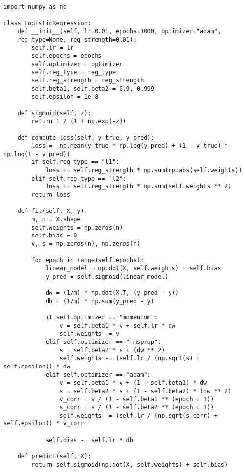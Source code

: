\begin{verbatim}
import numpy as np

class LogisticRegression:
    def __init__(self, lr=0.01, epochs=1000, optimizer="adam", 
    reg_type=None, reg_strength=0.01):
        self.lr = lr
        self.epochs = epochs
        self.optimizer = optimizer
        self.reg_type = reg_type
        self.reg_strength = reg_strength
        self.beta1, self.beta2 = 0.9, 0.999
        self.epsilon = 1e-8

    def sigmoid(self, z):
        return 1 / (1 + np.exp(-z))

    def compute_loss(self, y_true, y_pred):
        loss = -np.mean(y_true * np.log(y_pred) + (1 - y_true) * np.log(1 - y_pred))
        if self.reg_type == "l1":
            loss += self.reg_strength * np.sum(np.abs(self.weights))
        elif self.reg_type == "l2":
            loss += self.reg_strength * np.sum(self.weights ** 2)
        return loss

    def fit(self, X, y):
        m, n = X.shape
        self.weights = np.zeros(n)
        self.bias = 0
        v, s = np.zeros(n), np.zeros(n)

        for epoch in range(self.epochs):
            linear_model = np.dot(X, self.weights) + self.bias
            y_pred = self.sigmoid(linear_model)

            dw = (1/m) * np.dot(X.T, (y_pred - y))
            db = (1/m) * np.sum(y_pred - y)

            if self.optimizer == "momentum":
                v = self.beta1 * v + self.lr * dw
                self.weights -= v
            elif self.optimizer == "rmsprop":
                s = self.beta2 * s + (dw ** 2)
                self.weights -= (self.lr / (np.sqrt(s) + self.epsilon)) * dw
            elif self.optimizer == "adam":
                v = self.beta1 * v + (1 - self.beta1) * dw
                s = self.beta2 * s + (1 - self.beta2) * (dw ** 2)
                v_corr = v / (1 - self.beta1 ** (epoch + 1))
                s_corr = s / (1 - self.beta2 ** (epoch + 1))
                self.weights -= (self.lr / (np.sqrt(s_corr) + self.epsilon)) * v_corr

            self.bias -= self.lr * db

    def predict(self, X):
        return self.sigmoid(np.dot(X, self.weights) + self.bias)
\end{verbatim}

